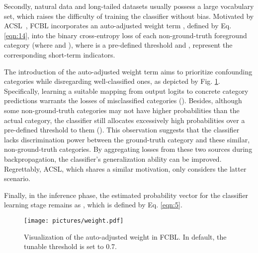 \documentclass[lettersize,journal]{IEEEtran}
\begin{document}
Secondly, natural data and long-tailed datasets usually possess a large vocabulary set, which raises the difficulty of training the classifier without bias.
Motivated by ACSL~\cite{wang2021adaptive}, FCBL incorporates an auto-adjusted weight term , defined by Eq. \eqref{eqn:14}, into the binary cross-entropy loss of each non-ground-truth foreground category  (where  and ), where  is a pre-defined threshold and ,  represent the corresponding short-term indicators.

The introduction of the auto-adjusted weight term aims to prioritize confounding categories while disregarding well-classified ones, as depicted by Fig. \ref{pic:4}.
Specifically, learning a suitable mapping from output logits to concrete category predictions warrants the losses of misclassified categories ().
Besides, although some non-ground-truth categories may not have higher probabilities than the actual category, the classifier still allocates excessively high probabilities over a pre-defined threshold to them ().
This observation suggests that the classifier lacks discrimination power between the ground-truth category and these similar, non-ground-truth categories.
By aggregating losses from these two sources during backpropagation, the classifier's generalization ability can be improved.
Regrettably, ACSL, which shares a similar motivation, only considers the latter scenario.

Finally, in the inference phase, the estimated probability vector for the classifier learning stage remains as , which is defined by Eq. \eqref{eqn:5}.

\begin{figure}
    \centering
    \texttt{[image: pictures/weight.pdf]}
    \caption{Visualization of the auto-adjusted weight in FCBL. In default, the tunable threshold  is set to 0.7.}
    \label{pic:4}
\end{figure}
\end{document}
